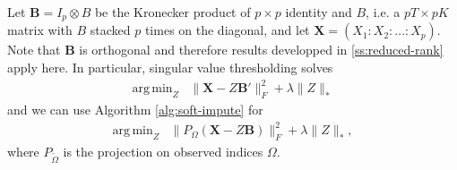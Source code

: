 \documentclass[preprint]{imsart}
\numberwithin{equation}{section}
\theoremstyle{plain}
\newcommand{\bX}{\mathbf{X}}
\newcommand{\bB}{\mathbf{B}}
\DeclareMathOperator*{\argmin}{arg\,min}
\begin{document}

Let $ \bB = I_p \otimes B $ be the Kronecker product of $p \times p$ identity and $B$, i.e. a $pT \times pK$ matrix with $B$ stacked $p$ times on the diagonal, and let $\bX = (X_{1}: X_{2}:...: X_{p})$. Note that $\bB$ is orthogonal and therefore results developped in \eqref{ss:reduced-rank} apply here. In particular, singular value thresholding solves
\begin{align*}\label{eq:multivar-scaled}
\argmin_{Z} &\| \bX - Z \bB' \|_F^2 + \lambda\|Z\|_*
\end{align*}
and we can use Algorithm \ref{alg:soft-impute} for 
\begin{align*}%
\argmin_{Z} &\| P_{\Omega}\left(\bX - Z\bB\right) \|_F^2 + \lambda\|Z\|_*,
\end{align*}
where $P_{\tilde{\Omega}}$ is the projection on observed indices $\Omega$.

\end{document}
